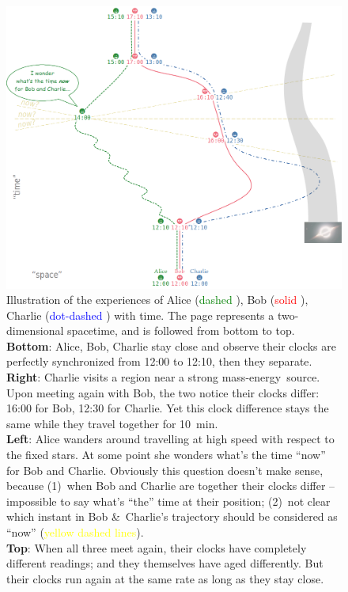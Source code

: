 \documentclass[a4paper,12pt,%
onecolumn,oneside,titlepage,%
british%
]{memoir}
\newcommand*{\amp}{\&}
\renewcommand*{\|}[1][]{\nonscript\:#1\vert\nonscript\:\mathopen{}}
\newcommand*{\masse}{mass-energy}
\begin{document}
\begin{figure}[p]
  \includegraphics[width=\linewidth]{images/ABC_spacetime.png}
  \caption{Illustration of the experiences of Alice (\textcolor{green}{dashed }), Bob (\textcolor{red}{solid }), Charlie (\textcolor{blue}{dot-dashed }) with time. The page represents a two-dimensional spacetime, and is followed from bottom to top.
\\\textbf{Bottom}: Alice, Bob, Charlie stay close and observe their clocks are perfectly synchronized from 12:00 to 12:10, then they separate.
\\\textbf{Right}: Charlie visits a region near a strong \masse\ source. Upon meeting again with Bob, the two notice their clocks differ: 16:00 for Bob, 12:30 for Charlie. Yet this clock difference stays the same while they travel together for \qty{10}{min}.
\\\textbf{Left}: Alice wanders around travelling at high speed with respect to the fixed stars. At some point she wonders what's the time \enquote{now} for Bob and Charlie. Obviously this question doesn't make sense, because
(1)~when Bob and Charlie are together their clocks differ -- impossible to say what's \enquote{the} time at their position; (2)~not clear which instant in Bob \amp\ Charlie's trajectory should be considered as \enquote{now} (\textcolor{yellow}{yellow dashed lines}).
\\\textbf{Top}: When all three meet again, their clocks have completely different readings; and they themselves have aged differently. But their clocks run again at the same rate as long as they stay close.}  \label{fig:ABC_spacetime}
\end{figure}
\end{document}
